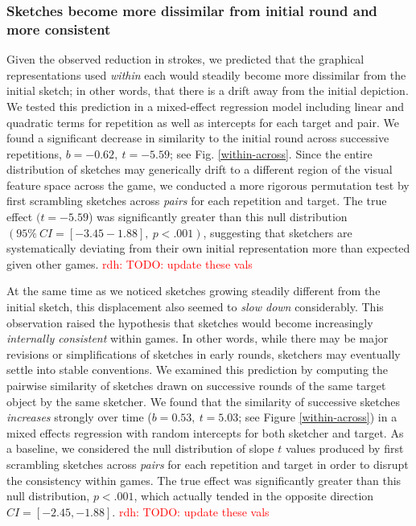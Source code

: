\documentclass[10pt,letterpaper]{article}
\newcommand{\rdh}[1]{\textcolor{Red}{rdh: #1}}
\begin{document}
\subsubsection{Sketches become more dissimilar from initial round and more consistent}

Given the observed reduction in strokes, we predicted that the graphical representations used \emph{within} each would steadily become more dissimilar from the initial sketch; in other words, that there is a drift away from the initial depiction.
We tested this prediction in a mixed-effect regression model including linear and quadratic terms for repetition as well as intercepts for each target and pair. 
We found a significant decrease in similarity to the initial round across successive repetitions, $b = -0.62,~t = -5.59$; see Fig. \ref{within-across}.
Since the entire distribution of sketches may generically drift to a different region of the visual feature space across the game, we conducted a more rigorous permutation test by first scrambling sketches across \emph{pairs} for each repetition and target.
The true effect $(t = -5.59$) was significantly greater than this null distribution $(95\%~CI= [-3.45 -1.88], ~p < .001)$, suggesting that sketchers are systematically deviating from their own initial representation more than expected given other games. \rdh{TODO: update these vals}

At the same time as we noticed sketches growing steadily different from the initial sketch, this displacement also seemed to \emph{slow down} considerably.
This observation raised the hypothesis that sketches would become increasingly \emph{internally consistent} within games. 
In other words, while there may be major revisions or simplifications of sketches in early rounds, sketchers may eventually settle into stable conventions.
We examined this prediction by computing the pairwise similarity of sketches drawn on successive rounds of the same target object by the same sketcher. 
We found that the similarity of successive sketches \emph{increases} strongly over time ($b = 0.53,~t = 5.03$; see Figure \ref{within-across}) in a mixed effects regression with random intercepts for both sketcher and target. 
As a baseline, we considered the null distribution of slope $t$ values produced by first scrambling sketches across \emph{pairs} for each repetition and target in order to disrupt the consistency within games.
The true effect was significantly greater than this null distribution, $p < .001$, which actually tended in the opposite direction $CI = [-2.45, -1.88]$.  \rdh{TODO: update these vals}
\end{document}
